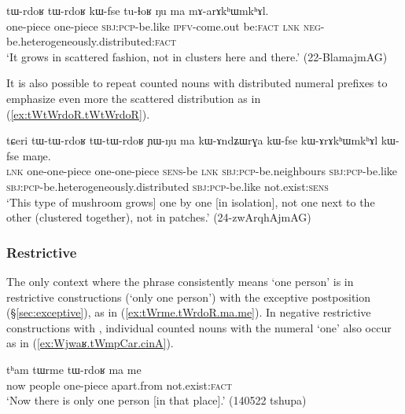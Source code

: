 \begin{exe}
	\ex \label{ex:tWrdoR.tWrdoR}
	\gll  tɯ-rdoʁ tɯ-rdoʁ kɯ-fse tu-ɬoʁ ŋu ma mɤ-arɤkʰɯmkʰɤl. \\
	one-piece one-piece \textsc{sbj}:\textsc{pcp}-be.like \textsc{ipfv}-come.out  be:\textsc{fact} \textsc{lnk} \textsc{neg}-be.heterogeneously.distributed:\textsc{fact} \\
	\glt `It grows in scattered fashion, not in clusters here and there.' (22-BlamajmAG)
\end{exe}

It is also possible to repeat counted nouns with distributed numeral prefixes to emphasize even more the scattered distribution as in (\ref{ex:tWtWrdoR.tWtWrdoR}).

\begin{exe}
	\ex \label{ex:tWtWrdoR.tWtWrdoR}
	\gll 
	tɕeri tɯ-tɯ-rdoʁ tɯ-tɯ-rdoʁ ɲɯ-ŋu ma kɯ-ɤndʑɯrɣa kɯ-fse kɯ-ɤrɤkʰɯmkʰɤl kɯ-fse maŋe.  \\
	\textsc{lnk} one-one-piece one-one-piece \textsc{sens}-be \textsc{lnk}  \textsc{sbj}:\textsc{pcp}-be.neighbours \textsc{sbj}:\textsc{pcp}-be.like \textsc{sbj}:\textsc{pcp}-be.heterogeneously.distributed \textsc{sbj}:\textsc{pcp}-be.like not.exist:\textsc{sens} \\
	\glt  `This type of mushroom grows] one by one [in isolation], not one next to the other (clustered together), not in patches.' (24-zwArqhAjmAG) 
\end{exe}


\subsubsection{Restrictive} \label{sec:CN.restrictive}

The only context where the phrase  consistently means `one person' is in restrictive constructions (`only one person') with the exceptive postposition  (§\ref{sec:exceptive}), as in (\ref{ex:tWrme.tWrdoR.ma.me}).  In negative restrictive constructions with , individual counted nouns with the numeral  `one' also occur as in (\ref{ex:Wjwaʁ.tWmpCar.cinA}).

\begin{exe}
	\ex \label{ex:tWrme.tWrdoR.ma.me}
	\gll tʰam tɯrme tɯ-rdoʁ ma me \\
	now people one-piece apart.from not.exist:\textsc{fact} \\
	\glt `Now there is only one person [in that place].' (140522 tshupa)
\end{exe} 

